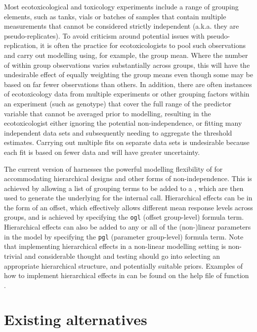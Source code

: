 \documentclass[
  shortnames]{jss}
\begin{document}
Most ecotoxicological and toxicology experiments include a range of grouping elements, such as tanks, vials or batches of samples that contain multiple measurements that cannot be considered strictly independent (a.k.a. they are pseudo-replicates). To avoid criticism around potential issues with pseudo-replication, it is often the practice for ecotoxicologists to pool such observations and carry out modelling using, for example, the group mean. Where the number of within group observations varies substantially across groups, this will have the undesirable effect of equally weighting the group means even though some may be based on far fewer observations than others. In addition, there are often instances of ecotoxicology data from multiple experiments or other grouping factors within an experiment (such as genotype) that cover the full range of the predictor variable that cannot be averaged prior to modelling, resulting in the ecotoxicologist either ignoring the potential non-independence, or fitting many independent data sets and subsequently needing to aggregate the threshold estimates. Carrying out multiple fits on separate data sets is undesirable because each fit is based on fewer data and will have greater uncertainty.

The current version of  harnesses the powerful modelling flexibility of  for accommodating hierarchical designs and other forms of non-independence. This is achieved by allowing a list of grouping terms to be added to a , which are then used to generate the underlying  for the  internal call. Hierarchical effects can be in the form of an offset, which effectively allows different mean response levels across groups, and is achieved by specifying the \texttt{ogl} (offset group-level) formula term. Hierarchical effects can also be added to any or all of the (non-)linear parameters in the model by specifying the \texttt{pgl} (parameter group-level) formula term. Note that implementing hierarchical effects in a non-linear modelling setting is non-trivial and considerable thought and testing should go into selecting an appropriate hierarchical structure, and potentially suitable priors. Examples of how to implement hierarchical effects in  can be found on the help file of function .

\section[Existing alternatives]{Existing alternatives}\label{bnchmrk}
\end{document}
